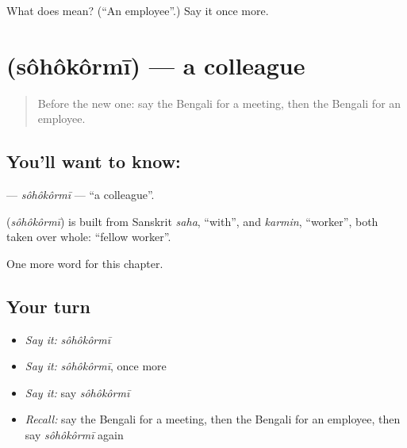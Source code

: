 \begin{tcolorbox}[breakable,colback=teal!4,colframe=teal!35!black,title={Before you move on}]
What does  mean? (\textquotedblleft{}An employee\textquotedblright{}.) Say it once more.
\end{tcolorbox}
\section[\texorpdfstring{\bn{সহকর্মী} (sôhôkôrmī)}{সহকর্মী (sôhôkôrmī)}]{ (sôhôkôrmī) — a colleague}

\label{lesson:BN-C235-sohokormi}



\begin{quote}
Before the new one: say the Bengali for a meeting, then the Bengali for an employee.
\end{quote}

\subsection*{You'll want to know: }
\textbf{} — \emph{sôhôkôrmī} — \textquotedblleft{}a colleague\textquotedblright{}.

\begin{cousinweb}
\textbf{} (\emph{sôhôkôrmī}) is built from Sanskrit \emph{saha}, \textquotedblleft{}with\textquotedblright{}, and \emph{karmin}, \textquotedblleft{}worker\textquotedblright{}, both taken over whole: \textquotedblleft{}fellow worker\textquotedblright{}.
\end{cousinweb}

\begin{grammarlens}[title={What you've built}]
One more word for this chapter.
\end{grammarlens}

\subsection*{Your turn}
\begin{itemize}
\raggedright
  \item \emph{Say it:} \emph{sôhôkôrmī}
  \item \emph{Say it:} \emph{sôhôkôrmī}, once more
  \item \emph{Say it:} say \emph{sôhôkôrmī}
  \item \emph{Recall:} say the Bengali for a meeting, then the Bengali for an employee, then say \emph{sôhôkôrmī} again
\end{itemize}

